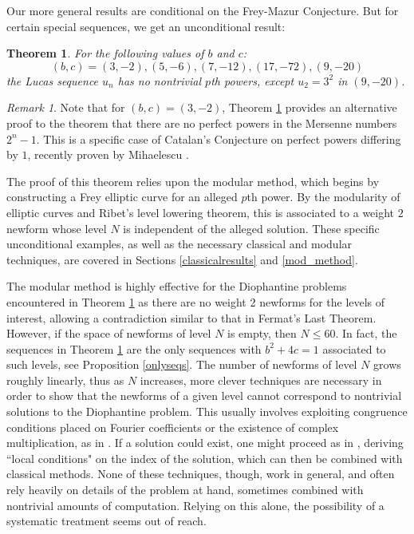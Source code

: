 \documentclass[12pt]{amsart}
\newtheorem{ithm}{Theorem}
\theoremstyle{definition}
\theoremstyle{remark}
\newtheorem*{rem}{Remark}
\begin{document}
Our more general results are conditional on the Frey-Mazur Conjecture. But for certain special sequences, we get an unconditional result:

\begin{ithm}\label{explicit_eg_thm}
For the following values of $b$ and $c$:
\begin{equation}\label{examples} (b,c) = (3,-2), (5,-6), (7,-12), (17,-72), (9,-20) \end{equation}
the Lucas sequence $u_n$ has no nontrivial $p$th powers, except $u_2 = 3^2$ in $(9,-20)$.  \end{ithm}

\begin{rem}
Note that for $(b,c) = (3,-2)$, Theorem \ref{explicit_eg_thm} provides an alternative proof to the theorem that there are no perfect powers in the Mersenne numbers $2^n - 1$.  This is a specific case of Catalan's Conjecture on perfect powers differing by $1$, recently proven by Mihaelescu \cite{mih04}.  
\end{rem}

The proof of this theorem relies upon the modular method, which begins by constructing a Frey elliptic curve for an alleged $p$th power.  By the modularity of elliptic curves and Ribet's level lowering theorem, this is associated to a weight $2$ newform whose level $N$ is independent of the alleged solution.  These specific unconditional examples, as well as the necessary classical and modular techniques, are covered in Sections \ref{classicalresults} and \ref{mod_method}.

The modular method is highly effective for the Diophantine problems encountered in Theorem \ref{explicit_eg_thm} as there are no weight 2 newforms for the levels of interest, allowing a contradiction similar to that in Fermat's Last Theorem.  However, if the space of newforms of level $N$ is empty, then $N \leq 60$.  In fact, the sequences in Theorem \ref{explicit_eg_thm} are the only sequences with $b^2+4c = 1$ associated to such levels, see Proposition \ref{onlyseqs}.  The number of newforms of level $N$ grows roughly linearly, thus as $N$ increases, more clever techniques are necessary in order to show that the newforms of a given level cannot correspond to nontrivial solutions to the Diophantine problem.  This usually involves exploiting congruence conditions placed on Fourier coefficients or the existence of complex multiplication, as in \cite{bennett04}.  If a solution could exist, one might proceed as in \cite{siksek06}, deriving ``local conditions" on the index of the solution, which can then be combined with classical methods.  None of these techniques, though, work in general, and often rely heavily on details of the problem at hand, sometimes combined with nontrivial amounts of computation.  Relying on this alone, the possibility of a systematic treatment seems out of reach.
\end{document}
